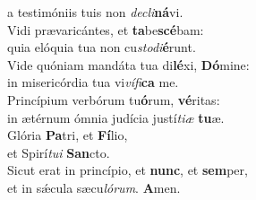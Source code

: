 \oddverse a testimóniis tuis non \textit{de}\textit{cli}\textbf{ná}vi.\\
\evenverse Vidi prævaricántes, et \textbf{ta}be\textbf{scé}bam:~\*\\
\evenverse quia elóquia tua non cu\textit{sto}\textit{di}\textbf{é}runt.\\
\oddverse Vide quóniam mandáta tua di\textbf{lé}xi, \textbf{Dó}mine:~\*\\
\oddverse in misericórdia tua vi\textit{ví}\textit{fi}\textbf{ca} me.\\
\evenverse Princípium verbórum tu\textbf{ó}rum, \textbf{vé}ritas:~\*\\
\evenverse in ætérnum ómnia judícia justí\textit{ti}\textit{æ} \textbf{tu}æ.\\
\oddverse Glória \textbf{Pa}tri, et \textbf{Fí}lio,~\*\\
\oddverse et Spirí\textit{tu}\textit{i} \textbf{San}cto.\\
\evenverse Sicut erat in princípio, et \textbf{nunc}, et \textbf{sem}per,~\*\\
\evenverse et in sǽcula sæcu\textit{ló}\textit{rum}. \textbf{A}men.\\

